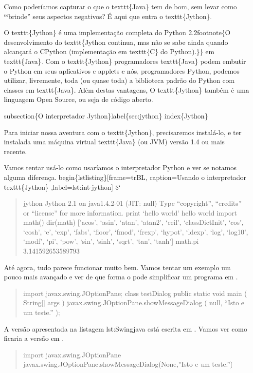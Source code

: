 \documentclass[a4paper,10pt,brazil]{sphinxmanual}
\begin{document}
Como poderíamos capturar o que o texttt\{Java\} tem de bom, sem levar como {\color{red}\bfseries{}{}`{}`}brinde'' seus aspectos negativos? É aqui que entra o texttt\{Jython\}.

O texttt\{Jython\} é uma implementação completa do Python 2.2footnote\{O desenvolvimento do texttt\{Jython continua, mas não se sabe ainda quando alcançará o CPython (implementação em texttt\{C\} do Python).\}\} em texttt\{Java\}. Com o texttt\{Jython\} programadores texttt\{Java\} podem embutir o Python em seus aplicativos e applets e nós, programadores Python, podemos utilizar, livremente, toda (ou quase toda) a biblioteca padrão do Python com classes em texttt\{Java\}. Além destas vantagens, O texttt\{Jython\} também é uma linguagem Open Source, ou seja de código aberto.

subsection\{O interpretador Jython\}label\{sec:jython\}
index\{Jython\}

Para iniciar nossa aventura com o texttt\{Jython\}, precisaremos instalá-lo, e ter instalada uma máquina virtual texttt\{Java\} (ou JVM)  versão 1.4 ou mais recente.

Vamos tentar usá-lo como usaríamos o interpretador Python e ver se notamos alguma diferença.
begin\{lstlisting\}{[}frame=trBL, caption=Usando o interpretador texttt\{Jython\} ,label=lst:int-jython{]}
\${}`
\begin{quote}

jython Jython 2.1 on java1.4.2-01 (JIT: null) Type ``copyright'',
``credits'' or ``license'' for more information. print `hello world'
hello world import math() dir(math) {[}'acos', `asin', `atan',
`atan2', `ceil', `classDictInit', `cos', `cosh', `e', `exp',
`fabs', `floor', `fmod', `frexp', `hypot', `ldexp', `log', `log10',
`modf', `pi', `pow', `sin', `sinh', `sqrt', `tan', `tanh'{]} math.pi
3.141592653589793
\end{quote}

Até agora, tudo parece funcionar muito bem. Vamos tentar um exemplo
um pouco mais avançado e ver de que forma o  pode
simplificar um programa em .
\begin{quote}

import javax.swing.JOptionPane; class testDialog public static void
main ( String{[}{]} args ) javax.swing.JOptionPane.showMessageDialog (
null, ``Isto e um teste.'' );
\end{quote}

A versão apresentada na listagem lst:Swingjava está escrita em
. Vamos ver como ficaria a versão em .
\begin{quote}

import javax.swing.JOptionPane
javax.swing.JOptionPane.showMessageDialog(None,''Isto e um
teste.'')
\end{quote}
\end{document}
